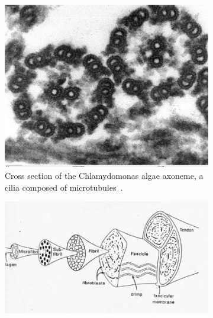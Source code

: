 \begin{figure}\centering
\begin{subfigure}{.28\linewidth}\centering
  \includegraphics[width=\linewidth]{img/Chlamydomonas_TEM_17}
  \caption{Cross section of the Chlamydomonas algae axoneme, a cilia composed of microtubules~\cite{wikimediacommons2007cilia}.}
  \label{fig:material_examples:microtubule}
\end{subfigure}\hfill
\begin{subfigure}{.40\linewidth}\centering
  \includegraphics[width=\linewidth]{img/ligten2}

\end{subfigure}
\end{figure}
